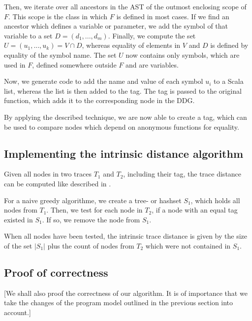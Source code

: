 Then, we iterate over all ancestors in the AST of the outmost enclosing scope of $F$. This scope is the class in which $F$ is defined in most cases. If we find an ancestor which defines a variable or parameter, we add the symbol of that variable to a set $D = (d_1, ..., d_m)$. Finally, we compute the set $U = (u_1, ..., u_k) = V \cap D$, whereas equality of elements in $V$ and $D$ is defined by equality of the symbol name. The set $U$ now contains only symbols, which are used in $F$, defined somewhere outside $F$ and are variables. 

Now, we generate code to add the name and value of each symbol $u_i$ to a Scala list, whereas the list is then added to the tag. The tag is passed to the original function, which adds it to the corresponding node in the DDG.  

By applying the described technique, we are now able to create a tag, which can be used to compare nodes which depend on anonymous functions for equality. 

\subsection{Implementing the intrinsic distance algorithm}
Given all nodes in two traces $T_1$ and $T_2$, including their tag, the trace distance can be computed like described in \cite{Acar2005thesis}.  

For a naive greedy algorithme, we create a tree- or hashset $S_1$, which holds all nodes from $T_1$. Then, we test for each node in $T_2$, if a node with an equal tag existed in $S_1$. If so, we remove the node from $S_1$.

When all nodes have been tested, the intrinsic trace distance is given by the size of the set $|S_1|$ plus the count of nodes from $T_2$ which were not contained in $S_1$. 
\subsection{Proof of correctness}
[We shall also proof the correctness of our algorithm. It is of importance that we take the changes of the program model outlined in the previous section into account.]